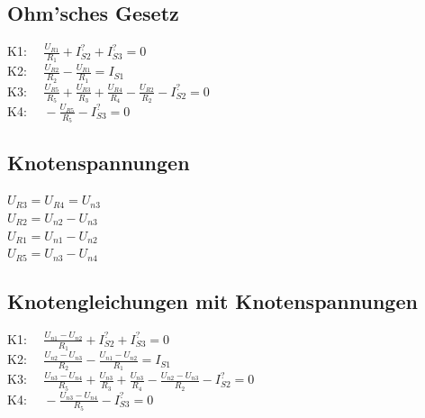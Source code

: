 \documentclass[11pt]{scrartcl}
\begin{document}
\subsection{Ohm'sches Gesetz}
\begin{spacing}{2.5}
K1: \(\displaystyle \quad \frac{U_{R1}}{R_1} + I_{S2}^? + I_{S3}^? = 0\) \\
K2: \(\displaystyle \quad \frac{U_{R2}}{R_2} - \frac{U_{R1}}{R_1} = I_{S1}\) \\
K3: \(\displaystyle \quad \frac{U_{R5}}{R_5} + \frac{U_{R3}}{R_3} + \frac{U_{R4}}{R_4} - \frac{U_{R2}}{R_2} - I_{S2}^? = 0\) \\
K4: \(\displaystyle \quad - \frac{U_{R5}}{R_5} - I_{S3}^? = 0\)
\end{spacing}

\subsection{Knotenspannungen}\label{sec:knotenspannungen}
\begin{doublespace}
\(\displaystyle U_{R3} = U_{R4} = U_{n3}\) \\
\(\displaystyle U_{R2} = U_{n2}- U_{n3}\) \\
\(\displaystyle U_{R1} = U_{n1}- U_{n2}\) \\
\(\displaystyle U_{R5} = U_{n3}- U_{n4}\)
\end{doublespace}

\subsection{Knotengleichungen mit Knotenspannungen}
\begin{spacing}{2.5}
  K1: \(\displaystyle \quad \frac{U_{n1} - U_{n2}}{R_1} + I_{S2}^? + I_{S3}^? = 0\) \\
  K2: \(\displaystyle \quad \frac{U_{n2} - U_{n3}}{R_2} - \frac{U_{n1} - U_{n2}}{R_1} = I_{S1}\) \\
  K3: \(\displaystyle \quad \frac{U_{n3} - U_{n4}}{R_5} + \frac{U_{n3}}{R_3} + \frac{U_{n3}}{R_4} - \frac{U_{n2} - U_{n3}}{R_2} - I_{S2}^?= 0\) \\
  K4: \(\displaystyle \quad - \frac{U_{n3} - U_{n4}}{R_5} - I_{S3}^? = 0\)
\end{spacing}
\end{document}
